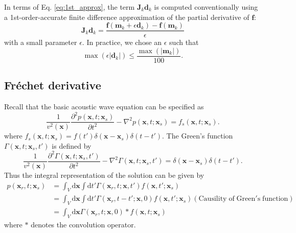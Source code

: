 In terms of Eq. \eqref{eq:1st_approx}, the term $\textbf{J}_k\textbf{d}_k$ is computed conventionally using a 1st-order-accurate finite difference approximation of the partial derivative of $\textbf{f}$:
\begin{equation}
\textbf{J}_k\textbf{d}_k=\frac{\textbf{f}(\textbf{m}_k+\epsilon \textbf{d}_k)-\textbf{f}(\textbf{m}_k)}{\epsilon}
\end{equation}
with a small parameter $\epsilon$. In practice, we chose an $\epsilon$ such that
\begin{equation}
\max(\epsilon |\textbf{d}_k|)\leqslant \frac{\max(|\textbf{m}_k|)}{100}.
\end{equation}

\subsection{Fr\'{e}chet derivative}

Recall that the basic acoustic wave equation can be specified as
\begin{equation}\label{eq:acoustic}
\frac{1}{v^2(\textbf{x})}\frac{\partial^2 p(\textbf{x},t;\textbf{x}_s)}{\partial t^2}-\nabla^2 p(\textbf{x},t;\textbf{x}_s)=f_s(\textbf{x},t;\textbf{x}_s).
\end{equation}
where $ f_s(\textbf{x},t;\textbf{x}_s)=f(t')\delta(\textbf{x}-\textbf{x}_s)\delta(t-t')$.
The Green's function $\Gamma(\textbf{x},t;\textbf{x}_s,t')$ is defined by
\begin{equation}
\frac{1}{v^2(\textbf{x})}\frac{\partial^2 \Gamma(\textbf{x},t;\textbf{x}_s,t')}{\partial t^2}
-\nabla^2 \Gamma(\textbf{x},t; \textbf{x}_s,t')
=\delta(\textbf{x}-\textbf{x}_s)\delta(t-t').
\end{equation}
Thus the integral representation of the solution can be given by
\begin{equation}
\begin{split}
p(\textbf{x}_r,t; \textbf{x}_s)&=\int_V \mathrm{d}\textbf{x}\int\mathrm{d}t'\Gamma(\textbf{x}_r,t;\textbf{x},t')f(\textbf{x},t';\textbf{x}_s)\\
&=\int_V \mathrm{d}\textbf{x}\int\mathrm{d}t'\Gamma(\textbf{x}_r,t-t';\textbf{x},0)f(\textbf{x},t';\textbf{x}_s)(\mathrm{Causility\; of\; Green's\; function})\\
&=\int_V \mathrm{d}\textbf{x}\Gamma(\textbf{x}_r,t;\textbf{x},0)*f(\textbf{x},t;\textbf{x}_s)
\end{split}
\end{equation}
where $*$ denotes the convolution operator.

